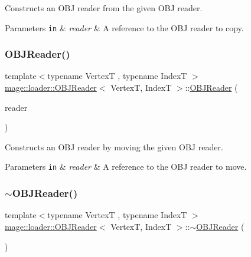 Constructs an O\+BJ reader from the given O\+BJ reader.


\begin{DoxyParams}[1]{Parameters}
\mbox{\tt in}  & {\em reader} & A reference to the O\+BJ reader to copy. \\
\hline
\end{DoxyParams}
\hypertarget{classmage_1_1loader_1_1_o_b_j_reader_a95867e96602f85c6c23f490635530c00}{}\label{classmage_1_1loader_1_1_o_b_j_reader_a95867e96602f85c6c23f490635530c00} 
\subsubsection{\texorpdfstring{O\+B\+J\+Reader()}{OBJReader()}\hspace{0.1cm}{\footnotesize\ttfamily [3/3]}}
{\footnotesize\ttfamily template$<$typename VertexT , typename IndexT $>$ \\
\hyperlink{classmage_1_1loader_1_1_o_b_j_reader}{mage\+::loader\+::\+O\+B\+J\+Reader}$<$ VertexT, IndexT $>$\+::\hyperlink{classmage_1_1loader_1_1_o_b_j_reader}{O\+B\+J\+Reader} (\begin{DoxyParamCaption}\item[{\hyperlink{classmage_1_1loader_1_1_o_b_j_reader}{O\+B\+J\+Reader}$<$ VertexT, IndexT $>$ \&\&}]{reader }\end{DoxyParamCaption})\hspace{0.3cm}{\ttfamily [noexcept]}}

Constructs an O\+BJ reader by moving the given O\+BJ reader.


\begin{DoxyParams}[1]{Parameters}
\mbox{\tt in}  & {\em reader} & A reference to the O\+BJ reader to move. \\
\hline
\end{DoxyParams}
\hypertarget{classmage_1_1loader_1_1_o_b_j_reader_a632f50cdf9e91ce2c1226b583ef6fde6}{}\label{classmage_1_1loader_1_1_o_b_j_reader_a632f50cdf9e91ce2c1226b583ef6fde6} 
\subsubsection{\texorpdfstring{$\sim$\+O\+B\+J\+Reader()}{~OBJReader()}}
{\footnotesize\ttfamily template$<$typename VertexT , typename IndexT $>$ \\
\hyperlink{classmage_1_1loader_1_1_o_b_j_reader}{mage\+::loader\+::\+O\+B\+J\+Reader}$<$ VertexT, IndexT $>$\+::$\sim$\hyperlink{classmage_1_1loader_1_1_o_b_j_reader}{O\+B\+J\+Reader} (\begin{DoxyParamCaption}{ }\end{DoxyParamCaption})}

